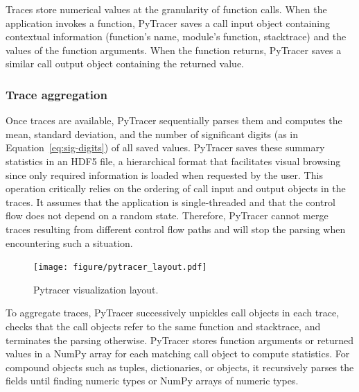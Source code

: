 \documentclass[10pt,journal,compsoc]{IEEEtran}
\newcommand{\pytracer}[0]{PyTracer\xspace}
\begin{document}
Traces store numerical values at the granularity of function calls. When the
application invokes a function, \pytracer saves a call input object containing
contextual information (function's name, module's function, stacktrace) and the
values of the function arguments. When the function returns, \pytracer saves a
similar call output object containing the returned value.

\subsubsection{Trace aggregation}

Once traces are available, \pytracer sequentially parses them and computes the
mean, standard deviation, and the number of significant digits (as in
Equation~\ref{eq:sig-digits}) of all saved values. \pytracer saves these summary
statistics in an HDF5 file, a hierarchical format that facilitates visual
browsing since only required information is loaded when requested by the user.
This operation critically relies on the ordering of call input and output
objects in the traces. It assumes that the application is single-threaded and
that the control flow does not depend on a random state. Therefore,
\mbox{\pytracer} cannot merge traces resulting from different control flow paths
and will stop the parsing when encountering such a situation.

\begin{figure}
    \centering
    \texttt{[image: figure/pytracer\_layout.pdf]}
    \caption{Pytracer visualization layout.}
    \label{fig:visu-layout}
\end{figure}

To aggregate traces, \pytracer successively unpickles call objects in each
trace, checks that the call objects refer to the same function and stacktrace,
and terminates the parsing otherwise. PyTracer stores function arguments or
returned values in a NumPy array for each matching call object to compute
statistics. For compound objects such as tuples, dictionaries, or objects, it
recursively parses the fields until finding numeric types or NumPy arrays of
numeric types.
\end{document}

